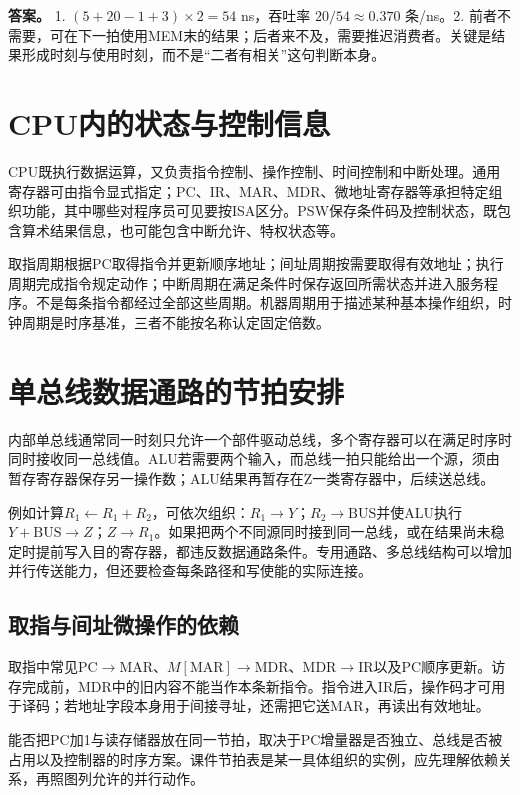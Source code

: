 \textbf{答案。} 1. \((5+20-1+3)\times2=54\) ns，吞吐率 \(20/54\approx0.370\) 条/ns。2. 前者不需要，可在下一拍使用MEM末的结果；后者来不及，需要推迟消费者。关键是结果形成时刻与使用时刻，而不是``二者有相关''这句判断本身。

\section{CPU内的状态与控制信息}\label{CO05-state-complete}

CPU既执行数据运算，又负责指令控制、操作控制、时间控制和中断处理。通用寄存器可由指令显式指定；PC、IR、MAR、MDR、微地址寄存器等承担特定组织功能，其中哪些对程序员可见要按ISA区分。PSW保存条件码及控制状态，既包含算术结果信息，也可能包含中断允许、特权状态等。

取指周期根据PC取得指令并更新顺序地址；间址周期按需要取得有效地址；执行周期完成指令规定动作；中断周期在满足条件时保存返回所需状态并进入服务程序。不是每条指令都经过全部这些周期。机器周期用于描述某种基本操作组织，时钟周期是时序基准，三者不能按名称认定固定倍数。

\section{单总线数据通路的节拍安排}\label{CO05-datapath-complete}

内部单总线通常同一时刻只允许一个部件驱动总线，多个寄存器可以在满足时序时同时接收同一总线值。ALU若需要两个输入，而总线一拍只能给出一个源，须由暂存寄存器保存另一操作数；ALU结果再暂存在Z一类寄存器中，后续送总线。

例如计算\(R_1\leftarrow R_1+R_2\)，可依次组织：\(R_1\to Y\)；\(R_2\to\mathrm{BUS}\)并使ALU执行\(Y+\mathrm{BUS}\to Z\)；\(Z\to R_1\)。如果把两个不同源同时接到同一总线，或在结果尚未稳定时提前写入目的寄存器，都违反数据通路条件。专用通路、多总线结构可以增加并行传送能力，但还要检查每条路径和写使能的实际连接。

\subsection{取指与间址微操作的依赖}\label{CO05-fetch-details}

取指中常见\(\mathrm{PC}\to\mathrm{MAR}\)、\(M[\mathrm{MAR}]\to\mathrm{MDR}\)、\(\mathrm{MDR}\to\mathrm{IR}\)以及PC顺序更新。访存完成前，MDR中的旧内容不能当作本条新指令。指令进入IR后，操作码才可用于译码；若地址字段本身用于间接寻址，还需把它送MAR，再读出有效地址。

能否把PC加1与读存储器放在同一节拍，取决于PC增量器是否独立、总线是否被占用以及控制器的时序方案。课件节拍表是某一具体组织的实例，应先理解依赖关系，再照图列允许的并行动作。

